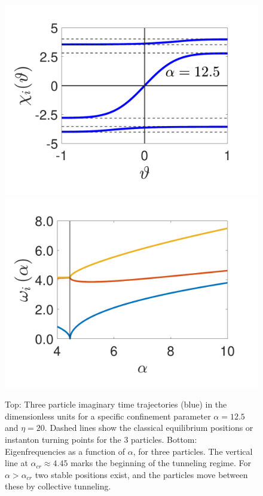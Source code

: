 \documentclass[prb,twocolumn,showpacs,preprintnumbers,amsmath,amssymb, superscriptaddress]{revtex4-2}
\newcommand{\1}{{1\hspace*{-0.5ex} \textrm{l} \hspace*{0.5ex}}}
\begin{document}
 \begin{figure}[h!]
    \begin{center}
    	\includegraphics[width=0.8\columnwidth]{Fig_3Particle_Trajectory}
     	\includegraphics[width=0.8\columnwidth]{Fig_Freqs.pdf}

     \caption{Top: Three particle imaginary time trajectories (blue) in the dimensionless units for a specific confinement parameter $\alpha = 12.5$ and $\eta = 20$. Dashed lines show the classical equilibrium positions or instanton turning points for the 3 particles. Bottom: Eigenfrequencies as a function of $\alpha$, for three particles. The vertical line at $\alpha_{cr} \approx 4.45$ marks the beginning of the tunneling regime. For $\alpha > \alpha_{cr}$ two stable positions exist, and the particles move between these by collective tunneling.}
     \label{fig:experimental_setup}
    \end{center}
\end{figure}  
\end{document}
